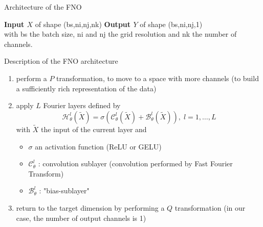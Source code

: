 \documentclass[compress,10pt,xcolor={table,dvipsnames},t]{beamer}
\begin{document}
	\begin{frame}{Architecture of the FNO}
		\begin{center}
			\centering
		\end{center}
		\textbf{Input $X$} of shape (bs,ni,nj,nk) \qquad \qquad \textbf{Output $Y$} of shape (bs,ni,nj,1) \\
		with bs the batch size, ni and nj the grid resolution and nk the number of channels.
	\end{frame}

	\begin{frame}{Description of the FNO architecture}
		\begin{center}
			\centering
		\end{center}
		\begin{enumerate}[\ding{217}]
			\item perform a $P$ transformation, to move to a space with more channels (to build a sufficiently rich representation of the data)
			\item apply $L$ Fourier layers defined by
			$$\mathcal{H}_\theta^l(\tilde{X})=\sigma\left(\mathcal{C}_\theta^l(\tilde{X})+\mathcal{B}_\theta^l(\tilde{X})\right),\; l=1,\dots,L$$
			with $\tilde{X}$ the input of the current layer and
			\begin{itemize}
				\item $\sigma$ an activation function (ReLU or GELU)
				\item $\mathcal{C}_\theta^l$ : convolution sublayer (convolution performed by Fast Fourier Transform)
				\item $\mathcal{B}_\theta^l$ : "bias-sublayer"
			\end{itemize}
			\item return to the target dimension by performing a $Q$ transformation (in our case, the number of output channels is 1)
		\end{enumerate}
	\end{frame}
\end{document}
